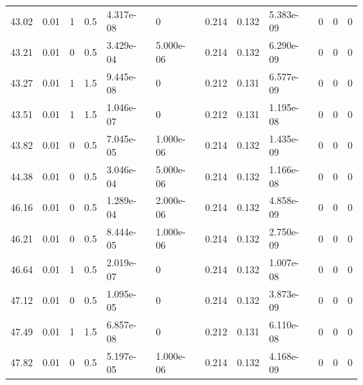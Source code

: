 \documentclass[preview]{standalone}
\begin{document}
{{{\begin{tabular}{L{1.2cm}C{1.2cm} C{0.3cm}C{0.5cm} C{1.4cm}C{1.4cm} C{1.4cm}C{1.4cm} C{1.6cm}C{1.6cm} C{1.6cm}C{1.6cm}}
  43.02  &  0.01  & 1     & 0.5 &  4.317e-08  & 0  &  0.214&   0.132& 5.383e-09 & 0   &  0 & 0  \\ 
  43.21  &  0.01  & 0     & 0.5 &  3.429e-04  & 5.000e-06  &  0.214&   0.132& 6.290e-09 & 0   &  0 & 0  \\ 
  43.27  &  0.01  & 1     & 1.5 &  9.445e-08  & 0  &  0.212&   0.131& 6.577e-09 & 0   &  0 & 0  \\ 
  43.51  &  0.01  & 1     & 1.5 &  1.046e-07  & 0  &  0.212&   0.131& 1.195e-08 & 0   &  0 & 0  \\ 
  43.82  &  0.01  & 0     & 0.5 &  7.045e-05  & 1.000e-06  &  0.214&   0.132& 1.435e-09 & 0   &  0 & 0  \\ 
  44.38  &  0.01  & 0     & 0.5 &  3.046e-04  & 5.000e-06  &  0.214&   0.132& 1.166e-08 & 0   &  0 & 0  \\ 
  46.16  &  0.01  & 0     & 0.5 &  1.289e-04  & 2.000e-06  &  0.214&   0.132& 4.858e-09 & 0   &  0 & 0  \\ 
  46.21  &  0.01  & 0     & 0.5 &  8.444e-05  & 1.000e-06  &  0.214&   0.132& 2.750e-09 & 0   &  0 & 0  \\ 
  46.64  &  0.01  & 1     & 0.5 &  2.019e-07  & 0  &  0.214&   0.132& 1.007e-08 & 0   &  0 & 0  \\ 
  47.12  &  0.01  & 0     & 0.5 &  1.095e-05  & 0  &  0.214&   0.132& 3.873e-09 & 0   &  0 & 0  \\ 
  47.49  &  0.01  & 1     & 1.5 &  6.857e-08  & 0  &  0.212&   0.131& 6.110e-08 & 0   &  0 & 0  \\ 
  47.82  &  0.01  & 0     & 0.5 &  5.197e-05  & 1.000e-06  &  0.214&   0.132& 4.168e-09 & 0   &  0 & 0  \\ 
\hline 
\end{tabular} 

}}}
\end{document}
